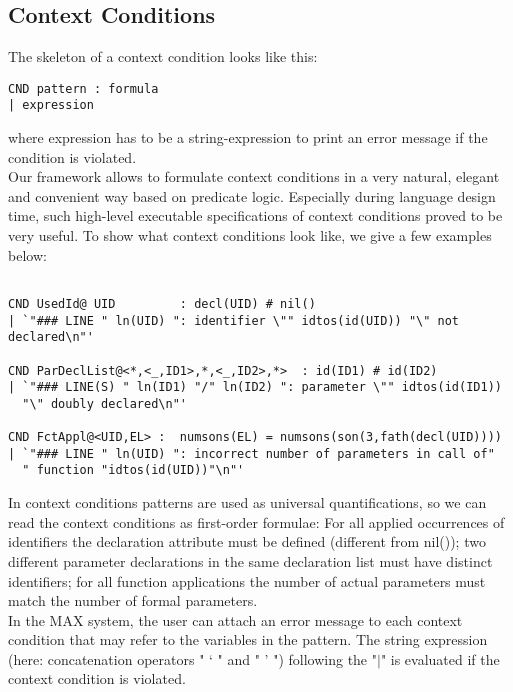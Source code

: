 \subsection{Context Conditions}
The skeleton of a context condition looks like this:
\begin{verbatim}
CND pattern : formula
| expression
\end{verbatim}
where expression has to be a string-expression to print an error message if the condition is violated.\\ 
Our framework allows to formulate context conditions in a very natural, elegant and convenient way based on predicate logic. Especially during language design time, such high-level executable specifications of context conditions proved to be very useful. To show what context conditions look like, we give a few examples below:
\begin{verbatim}

CND UsedId@ UID         : decl(UID) # nil()
| `"### LINE " ln(UID) ": identifier \"" idtos(id(UID)) "\" not declared\n"'

CND ParDeclList@<*,<_,ID1>,*,<_,ID2>,*>  : id(ID1) # id(ID2)
| `"### LINE(S) " ln(ID1) "/" ln(ID2) ": parameter \"" idtos(id(ID1))
  "\" doubly declared\n"'

CND FctAppl@<UID,EL> :  numsons(EL) = numsons(son(3,fath(decl(UID))))
| `"### LINE " ln(UID) ": incorrect number of parameters in call of"
  " function "idtos(id(UID))"\n"'

\end{verbatim}
In context conditions patterns are used as universal quantifications, so we can read the context conditions as first-order formulae: For all applied occurrences of identifiers the declaration attribute must be defined (different from nil()); two different parameter declarations in the same declaration list must have distinct identifiers; for all function applications the number of actual parameters must match the number of formal parameters.\\
In the MAX system, the user can attach an error message to each context condition that may refer to the variables in the pattern. The string expression
(here: concatenation operators " ` " and " ' ") following the "$\mid$" is evaluated if the context condition is violated.




   	

